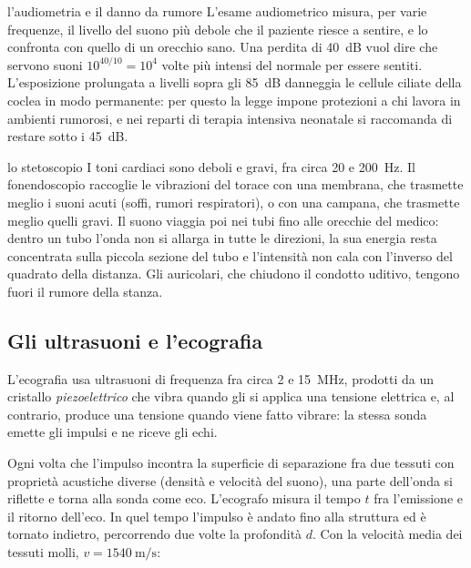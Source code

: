 

\begin{applicazione}{l'audiometria e il danno da rumore}
L'esame audiometrico misura, per varie frequenze, il livello del suono più debole che il paziente riesce a sentire, e lo confronta con quello di un orecchio sano. Una perdita di \SI{40}{\deci\bel} vuol dire che servono suoni $10^{40/10} = 10^{4}$ volte più intensi del normale per essere sentiti. L'esposizione prolungata a livelli sopra gli \SI{85}{\deci\bel} danneggia le cellule ciliate della coclea in modo permanente: per questo la legge impone protezioni a chi lavora in ambienti rumorosi, e nei reparti di terapia intensiva neonatale si raccomanda di restare sotto i \SI{45}{\deci\bel}.
\end{applicazione}

\begin{applicazione}{lo stetoscopio}
I toni cardiaci sono deboli e gravi, fra circa 20 e \SI{200}{\hertz}. Il fonendoscopio raccoglie le vibrazioni del torace con una membrana, che trasmette meglio i suoni acuti (soffi, rumori respiratori), o con una campana, che trasmette meglio quelli gravi. Il suono viaggia poi nei tubi fino alle orecchie del medico: dentro un tubo l'onda non si allarga in tutte le direzioni, la sua energia resta concentrata sulla piccola sezione del tubo e l'intensità non cala con l'inverso del quadrato della distanza. Gli auricolari, che chiudono il condotto uditivo, tengono fuori il rumore della stanza.
\end{applicazione}

\subsection{Gli ultrasuoni e l'ecografia}

L'ecografia usa ultrasuoni di frequenza fra circa 2 e \SI{15}{\mega\hertz}, prodotti da un cristallo \emph{piezoelettrico} che vibra quando gli si applica una tensione elettrica e, al contrario, produce una tensione quando viene fatto vibrare: la stessa sonda emette gli impulsi e ne riceve gli echi.

Ogni volta che l'impulso incontra la superficie di separazione fra due tessuti con proprietà acustiche diverse (densità e velocità del suono), una parte dell'onda si riflette e torna alla sonda come eco. L'ecografo misura il tempo $t$ fra l'emissione e il ritorno dell'eco. In quel tempo l'impulso è andato fino alla struttura ed è tornato indietro, percorrendo due volte la profondità $d$. Con la velocità media dei tessuti molli, $v = \SI{1540}{\metre\per\second}$:

